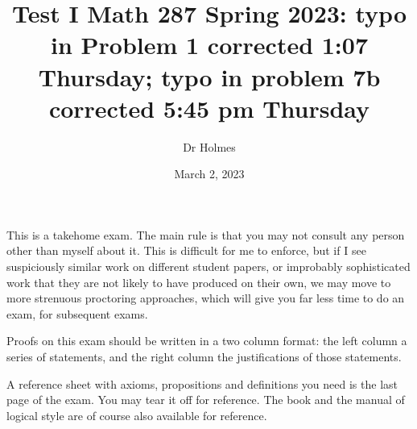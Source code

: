\documentclass[12pt]{article}
\title{Test I Math 287 Spring 2023:  typo in Problem 1  corrected 1:07 Thursday; typo in problem 7b corrected 5:45 pm Thursday}
\author{Dr Holmes}
\date{March 2, 2023}
\begin{document}
\maketitle

This is a takehome exam. The main rule is that you may not consult any person other than myself about it.  This is difficult for me to enforce, but if I see
suspiciously similar work on different student papers, or improbably sophisticated work that they are not likely to have produced on their own, we may move to more strenuous proctoring approaches, which will give you far less time to do an exam, for subsequent exams.

Proofs on this exam should be written in a two column format:  the left column a series of statements, and the right column the justifications of those statements.

A reference sheet with axioms, propositions and definitions you need is the last page of the exam.  You may tear it off for reference.  The book and the manual of logical style are of course also available for reference.



\newpage
\end{document}
